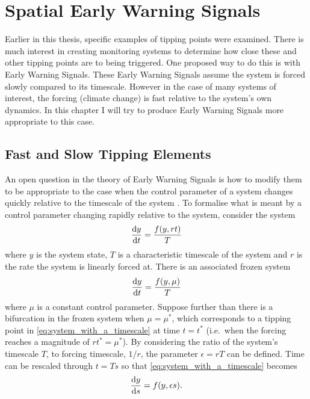 \chapter{Spatial Early Warning Signals}
\label{chapter:spatial_ews}
\graphicspath{{spatial_ews/figs}}

Earlier in this thesis, specific examples of tipping points were examined.
There is much interest in creating monitoring systems to determine how close these and other tipping points are to being triggered.
One proposed way to do this is with Early Warning Signals. These Early Warning Signals assume the system is forced slowly compared to its timescale.
However in the case of many systems of interest, the forcing (climate change) is fast relative to the system's own dynamics.
In this chapter I will try to produce Early Warning Signals more appropriate to this case.

\section{Fast and Slow Tipping Elements}
An open question in the theory of Early Warning Signals is how to modify them to be appropriate to the case when the control parameter of a system
changes quickly relative to the timescale of the system \parencite{VanderBolt2021}. To formalise what is meant by a control parameter changing rapidly relative
to the system, consider the system
\begin{equation}
  \label{eq:system_with_a_timescale}
  \dv{y}{t} = \frac{f(y,rt)}{T}
\end{equation}
where $y$ is the system state, $T$ is a characteristic timescale of the system and $r$ is the rate the system is linearly forced
at. There is an associated frozen system
\begin{equation}
  \label{eq:system_with_a_timescale_frozen}
  \dv{y}{t} = \frac{f(y,\mu)}{T}
\end{equation}
where $\mu$ is a constant control parameter. Suppose further than there is a bifurcation in the frozen system when
$\mu = \mu^*$, which corresponds to a tipping point in \cref{eq:system_with_a_timescale} at time $t = t^*$ (i.e.\ when the forcing reaches a magnitude of $rt^* = \mu^*$).
By considering the ratio of the system's timescale $T$, to forcing timescale, $1/r$,  the parameter $\epsilon = rT$ can be defined. Time can be rescaled through $t=Ts$
so that \cref{eq:system_with_a_timescale} becomes
\begin{equation}
  \label{eq:system_with_a_timescale_rescaled}
  \dv{y}{s} = f(y,\epsilon s).
\end{equation}

